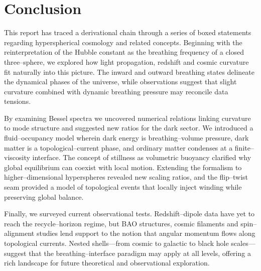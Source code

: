 \documentclass{article}
\begin{document}
\section{Conclusion}
\label{sec:conclusion}
This report has traced a derivational chain through a series of boxed statements regarding hyperspherical cosmology and related concepts.  Beginning with the reinterpretation of the Hubble constant as the breathing frequency of a closed three–sphere, we explored how light propagation, redshift and cosmic curvature fit naturally into this picture.  The inward and outward breathing states delineate the dynamical phases of the universe, while observations suggest that slight curvature combined with dynamic breathing pressure may reconcile data tensions.

By examining Bessel spectra we uncovered numerical relations linking curvature to mode structure and suggested new ratios for the dark sector.  We introduced a fluid–occupancy model wherein dark energy is breathing–volume pressure, dark matter is a topological–current phase, and ordinary matter condenses at a finite–viscosity interface.  The concept of stillness as volumetric buoyancy clarified why global equilibrium can coexist with local motion.  Extending the formalism to higher–dimensional hyperspheres revealed new scaling ratios, and the flip–twist seam provided a model of topological events that locally inject winding while preserving global balance.

Finally, we surveyed current observational tests.  Redshift–dipole data have yet to reach the recycle–horizon regime, but BAO structures, cosmic filaments and spin–alignment studies lend support to the notion that angular momentum flows along topological currents.  Nested shells—from cosmic to galactic to black hole scales—suggest that the breathing–interface paradigm may apply at all levels, offering a rich landscape for future theoretical and observational exploration.
\end{document}
